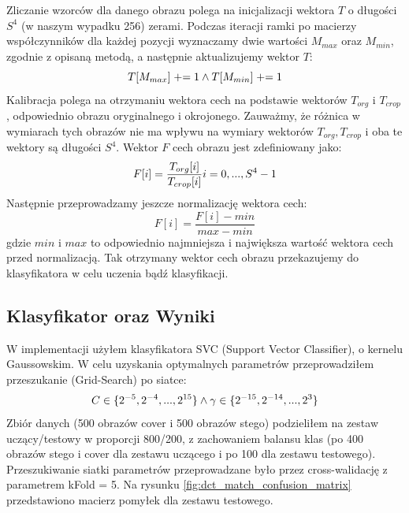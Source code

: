 Zliczanie wzorców dla danego obrazu polega na inicjalizacji wektora $T$ o długości $S^4$ (w naszym wypadku 256) zerami. Podczas iteracji ramki po macierzy współczynników dla każdej pozycji wyznaczamy dwie wartości $M_{max}$ oraz $M_{min}$, zgodnie z opisaną metodą, a następnie aktualizujemy wektor $T$: 
\begin{equation}
    T[M_{max}] \mathrel{+}= 1 \space \land \space 
    T[M_{min}] \mathrel{+}= 1
\end{equation}
Kalibracja polega na otrzymaniu wektora cech na podstawie wektorów $T_{org}$ i $T_{crop}$, odpowiednio obrazu oryginalnego i okrojonego. Zauważmy, że różnica w wymiarach tych obrazów nie ma wpływu na wymiary wektorów $T_{org}, T_{crop}$ i oba te wektory są długości $S^4$. Wektor $F$ cech obrazu jest zdefiniowany jako:
\begin{equation}
    F[i] = \frac{T_{org}[i]}{T_{crop}[i]} \space \space i=0,...,S^4-1
\end{equation}
Następnie przeprowadzamy jeszcze normalizację wektora cech:
\begin{equation}
    F[i] = \frac{F[i] - min}{max - min}
\end{equation}
gdzie $min$ i $max$ to odpowiednio najmniejsza i największa wartość wektora cech przed normalizacją. Tak otrzymany wektor cech obrazu przekazujemy do klasyfikatora w celu uczenia bądź klasyfikacji.

\subsection{Klasyfikator oraz Wyniki}
W implementacji użyłem klasyfikatora SVC (Support Vector Classifier), o kernelu Gaussowskim. W celu uzyskania optymalnych parametrów przeprowadziłem przeszukanie (Grid-Search) po siatce:
\begin{equation}
    C \in \{ 2^{-5}, 2^{-4}, ..., 2^{15}\} \space \land \space 
    \gamma \in \{ 2^{-15}, 2^{-14}, ..., 2^3\}
\end{equation}
Zbiór danych (500 obrazów cover i 500 obrazów stego) podzieliłem na zestaw uczący/testowy w proporcji 800/200, z zachowaniem balansu klas (po 400 obrazów stego i cover dla zestawu uczącego i po 100 dla zestawu testowego). Przeszukiwanie siatki parametrów przeprowadzane było przez cross-walidację z parametrem kFold = 5. Na rysunku \ref{fig:dct_match_confusion_matrix} przedstawiono macierz pomyłek dla zestawu testowego.

